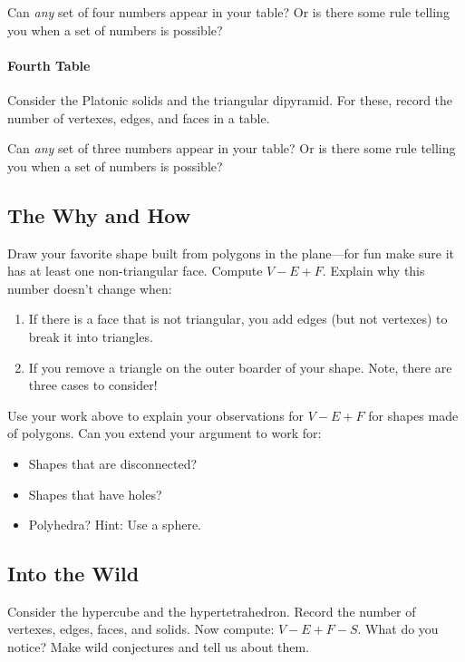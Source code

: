 \begin{prob}
Can \textit{any} set of four numbers appear in your table? Or is
there some rule telling you when a set of numbers is possible? 
\end{prob}


\paragraph{Fourth Table}

\begin{prob}
Consider the Platonic solids and the triangular dipyramid. For these,
record the number of vertexes, edges, and faces in a table.
\end{prob}


\begin{prob}
Can \textit{any} set of three numbers appear in your table? Or is
there some rule telling you when a set of numbers is possible? 
\end{prob}



\subsection*{The Why and How}


\begin{prob}
Draw your favorite shape built from polygons in the plane---for fun
make sure it has at least one non-triangular face. Compute
$V-E+F$. Explain why this number doesn't change when:
\begin{enumerate}
\item If there is a face that is not triangular, you add edges (but not vertexes) to break it into triangles. 
\item If you remove a triangle on the outer boarder of your shape. Note, there are three cases to consider!
\end{enumerate}
\end{prob}

\begin{prob}
Use your work above to explain your observations for $V-E+F$ for
shapes made of polygons. Can you extend your argument to work for: 
\begin{itemize}
\item Shapes that are disconnected? 
\item Shapes that have holes?
\item Polyhedra? Hint: Use a sphere.
\end{itemize} 
\end{prob}



\subsection*{Into the Wild}

\begin{prob}
Consider the hypercube and the hypertetrahedron. Record the number of
vertexes, edges, faces, and solids. Now compute: $V-E+F-S$. What do
you notice? Make wild conjectures and tell us about them.
\end{prob}


